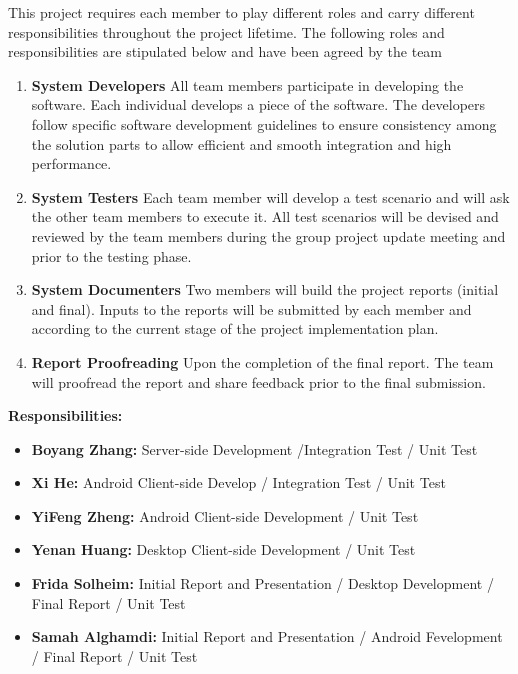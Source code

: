 \documentclass{article}
\begin{document}
This project requires each member to play different roles and carry different responsibilities throughout the project lifetime. The following roles and responsibilities are stipulated below and have been agreed by the team

\begin{enumerate}

  \item \textbf{System Developers} All team members participate in developing the software. Each individual develops a piece of the software. The developers follow specific software development guidelines to ensure consistency among the solution parts to allow efficient and smooth integration and high performance.
  \item \textbf{System Testers} Each team member will develop a test scenario and will ask the other team members to execute it. All test scenarios will be devised and reviewed by the team members during the group project update meeting and prior to the testing phase.
  \item \textbf{System Documenters} Two members will build the project reports (initial and final). Inputs to the reports will be submitted by each member and according to the current stage of the project implementation plan.
  \item \textbf{Report Proofreading} Upon the completion of the final report. The team will proofread the report and share feedback prior to the final submission.

\end{enumerate}

\textbf{Responsibilities:}

\begin{itemize}
  \item \textbf{Boyang Zhang:} Server-side Development /Integration Test / Unit Test
  \item \textbf{Xi He:} Android Client-side Develop / Integration Test / Unit Test
  \item \textbf{YiFeng Zheng:} Android Client-side Development / Unit Test
  \item \textbf{Yenan Huang:} Desktop Client-side Development / Unit Test
  \item \textbf{Frida Solheim:} Initial Report and Presentation / Desktop Development / Final Report / Unit Test
  \item \textbf{Samah Alghamdi:} Initial Report and Presentation / Android Fevelopment / Final Report / Unit Test
\end{itemize}
\end{document}
